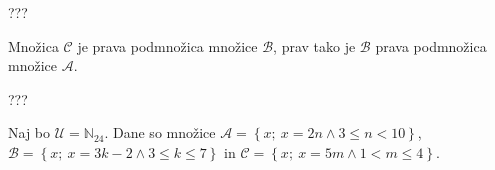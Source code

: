 \documentclass[addpoints,12pt]{exam}
\begin{document}
\begin{questions}


    \begin{solution}[9cm]
???
    \end{solution}

    \newpage

    \question
    Množica $\mathcal{C}$ je prava podmnožica množice $\mathcal{B}$, prav tako je $\mathcal{B}$ prava podmnožica množice $\mathcal{A}$.

    \begin{solution}[1cm]
???
    \end{solution}




    \newpage

    \question
    Naj bo $\mathcal{U}=\mathbb{N}_{24}$. Dane so množice $\mathcal{A}=\left\{x;\ x=2n \land 3\leq n<10\right\}$, $\mathcal{B}=\left\{x;\ x=3k-2 \land 3\leq k\leq 7\right\}$ in $\mathcal{C}=\left\{x;\ x=5m \land 1<m\leq 4\right\}$. 
    \begin{parts}

\end{parts}
\end{questions}
\end{document}
